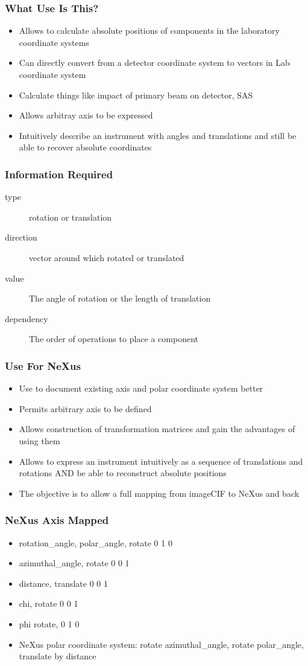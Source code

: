 \documentclass{beamer}
\begin{document}
\begin{frame} \frametitle{What Use Is This?}
\begin{itemize}
\item Allows to calculate absolute positions of components in the laboratory coordinate systems
\item Can directly convert from a detector coordinate system to  
 vectors in Lab coordinate system
\item Calculate things like impact of primary beam on detector, SAS
\item Allows arbitray axis to be expressed
\item Intuitively describe an instrument with angles and translations and still be able
 to recover absolute coordinates
\end{itemize}
\end{frame}


\begin{frame} \frametitle{Information Required}
\begin{description}
\item[type] rotation or translation
\item[direction] vector around which rotated or translated
\item[value] The angle of rotation or the length of translation
\item[dependency] The order of operations to place a component
\end{description}
\end{frame}


\begin{frame} \frametitle{Use For NeXus}
\begin{itemize}
\item Use to document existing axis and polar coordinate system better
\item Permits arbitrary axis to be defined
\item Allows construction of transformation matrices and gain the advantages of using them
\item Allows to express an instrument intuitively as a sequence of translations and 
 rotations AND be able to reconstruct absolute positions
\item The objective is to allow a full mapping from imageCIF to NeXus and back
\end{itemize}
\end{frame}

\begin{frame} \frametitle{NeXus Axis Mapped}
\begin{itemize}
\item rotation\_angle, polar\_angle, rotate 0 1 0
\item azimuthal\_angle, rotate 0 0 1
\item distance, translate 0 0  1
\item chi, rotate 0 0 1
\item phi rotate, 0 1 0
\item NeXus polar coordinate system: rotate azimuthal\_angle, rotate polar\_angle, 
 translate by distance
\end{itemize}
\end{frame}
\end{document}
